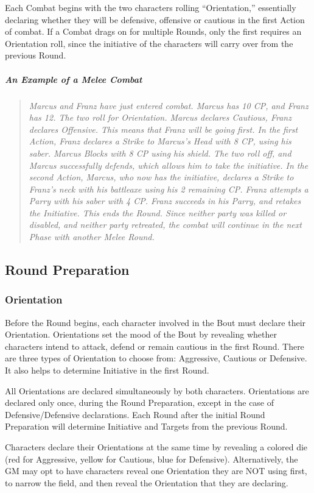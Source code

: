 \documentclass[oneside,11pt,english]{book}
\begin{document}
Each Combat begins with the two characters rolling “Orientation,” essentially declaring whether they will be defensive, offensive or cautious in the first Action of combat. If a Combat drags on for multiple 
Rounds, only the first requires an Orientation roll, since the initiative of the characters will carry over from the previous Round.
\subparagraph{An Example of a Melee Combat}
\begin{quotation}
	\emph{Marcus and Franz have just entered combat. Marcus has 10 CP, and Franz has 12.
	The two roll for Orientation. Marcus declares Cautious, Franz declares Offensive. This means that Franz
	will be going first.
	In the first Action, Franz declares a Strike to Marcus’s Head with 8 CP, using his saber. Marcus Blocks
	with 8 CP using his shield. The two roll off, and Marcus successfully defends, which allows him to take
	the initiative.
	In the second Action, Marcus, who now has the initiative, declares a Strike to Franz’s neck with his
	battleaxe using his 2 remaining CP. Franz attempts a Parry with his saber with 4 CP. Franz succeeds in
	his Parry, and retakes the Initiative. This ends the Round. Since neither party was killed or disabled, and
	neither party retreated, the combat will continue in the next Phase with another Melee Round.}
\end{quotation}

\subsection{Round Preparation}
\subsubsection{Orientation}
Before the Round begins, each character involved in the Bout must declare their Orientation.
Orientations set the mood of the Bout by revealing whether characters intend to attack, defend or remain
cautious in the first Round. There are three types of Orientation to choose from: Aggressive, Cautious or
Defensive. It also helps to determine Initiative in the first Round.

All Orientations are declared simultaneously by both characters. Orientations are declared only once,
during the Round Preparation, except in the case of Defensive/Defensive declarations. Each Round after
the initial Round Preparation will determine Initiative and Targets from the previous Round.

Characters declare their Orientations at the same time by revealing a colored die (red for Aggressive,
yellow for Cautious, blue for Defensive). Alternatively, the GM may opt to have characters reveal one
Orientation they are NOT using first, to narrow the field, and then reveal the Orientation that they are
declaring.
\end{document}
